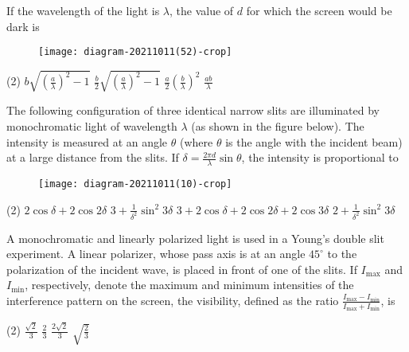 \begin{enumerate}
\begin{minipage}{\textwidth}
	If the wavelength of the light is $\lambda$, the value of $d$ for which the screen would be dark is
	\begin{figure}[H]
		\centering
		\texttt{[image: diagram-20211011(52)-crop]}
	\end{figure}
\end{minipage}
\begin{tasks}(2)
	\task[\textbf{A.}] $b \sqrt{\left(\frac{a}{\lambda}\right)^{2}-1}$
	\task[\textbf{B.}]$\frac{b}{2} \sqrt{\left(\frac{a}{\lambda}\right)^{2}-1}$
	\task[\textbf{C.}]$\frac{a}{2}\left(\frac{b}{\lambda}\right)^{2}$
	\task[\textbf{D.}]$\frac{a b}{\lambda}$
\end{tasks}
\begin{minipage}{\textwidth}
	\item The following configuration of three identical narrow slits are illuminated by monochromatic light of wavelength $\lambda$ (as shown in the figure below). The intensity is measured at an angle $\theta$ (where $\theta$ is the angle with the incident beam) at a large distance from the slits. If $\delta=\frac{2 \pi d}{\lambda} \sin \theta$, the intensity is proportional to
	\begin{figure}[H]
		\centering
		\texttt{[image: diagram-20211011(10)-crop]}
	\end{figure}
\end{minipage}
\begin{tasks}(2)
	\task[\textbf{A.}] $2 \cos \delta+2 \cos 2 \delta$
	\task[\textbf{B.}]$3+\frac{1}{\delta^{2}} \sin ^{2} 3 \delta$
	\task[\textbf{C.}] $3+2 \cos \delta+2 \cos 2 \delta+2 \cos 3 \delta$
	\task[\textbf{D.}]$2+\frac{1}{\delta^{2}} \sin ^{2} 3 \delta$
\end{tasks}
\begin{minipage}{\textwidth}
	\item A monochromatic and linearly polarized light is used in a Young's double slit experiment.
	A linear polarizer, whose pass axis is at an angle $45^{\circ}$ to the polarization of the incident
	wave, is placed in front of one of the slits. If $I_{\max }$ and $I_{\min }$, respectively, denote the maximum and minimum intensities of the interference pattern on the screen, the visibility, defined as the ratio $\frac{I_{\max }-I_{\min }}{I_{\max }+I_{\min }}$, is
\end{minipage}
\begin{tasks}(2)
	\task[\textbf{A.}] $\frac{\sqrt{2}}{3}$
	\task[\textbf{B.}]$\frac{2}{3}$
	\task[\textbf{C.}]$\frac{2 \sqrt{2}}{3}$
	\task[\textbf{D.}]$\sqrt{\frac{2}{3}}$
\end{tasks}
\end{enumerate}
